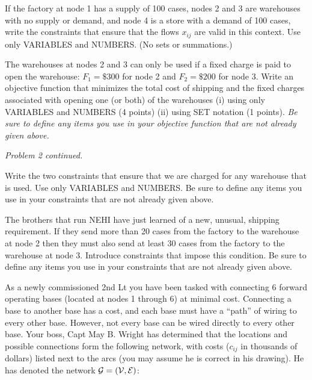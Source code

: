 \begin{parts}
If the factory at node 1 has a supply of 100 cases, nodes 2 and 3 are warehouses with no supply or demand, and node 4 is a store with a demand of 100 cases, write the constraints that ensure that the flows $x_{ij}$ are valid in this context.   Use only VARIABLES and NUMBERS.  (No sets or summations.)
\vfill
%
%
%

 The warehouses at nodes 2 and 3 can only be used if a fixed charge is paid to open the warehouse:  $F_1 = \$300$ for node 2 and $F_2 = \$200$ for node 3. Write an objective function that minimizes the total cost of shipping and the fixed charges associated with opening one (or both) of the warehouses (i) using only VARIABLES and NUMBERS (4 points)  (ii) using SET notation (1 points). \emph{Be sure to define any items you use in your objective function that are not already given above.}

\vfill 

\newpage
\noindent \emph{Problem 2 continued.}

 Write the two constraints that ensure that we are charged for any warehouse that is used. %
Use only VARIABLES and NUMBERS. Be sure to define any items you use in your constraints that are not already given above.

\vfill

 The brothers that run NEHI have just learned of a new, unusual, shipping requirement. If they send more than 20 cases from the factory to the warehouse at node 2 then they must also send at least 30 cases from the factory to the warehouse at node 3. Introduce constraints that impose this condition. Be sure to define any items you use in your constraints that are not already given above.

\vfill


\end{parts}
\newpage

As a newly commissioned 2nd Lt you have been tasked with connecting 6 forward operating bases (located at nodes 1 through 6) at minimal cost.  Connecting a base to another base has a cost, and each base must have a ``path'' of wiring to every other base. However, not every base can be wired directly to every other base.  Your boss, Capt May B. Wright has
determined that the locations and possible connections form the following network, with costs
($c_{ij}$ in thousands of dollars) listed next to the arcs (you may assume he is correct in his drawing). He has denoted the network ${\cal G} = ({\cal V}, {\cal E})$:

